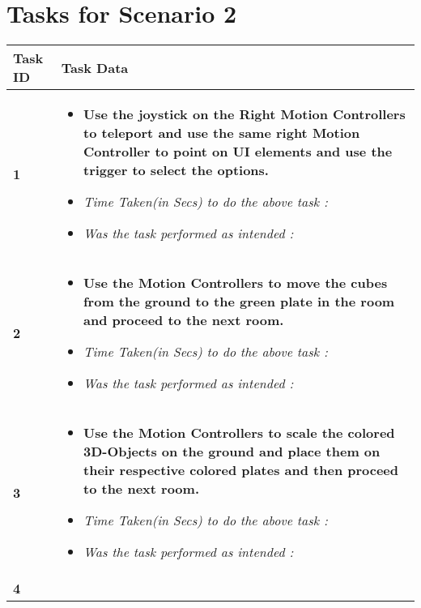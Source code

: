 \documentclass{article}
\begin{document}
\section*{Tasks for \textbf{Scenario 2}}
\begin{table}[htb]
	\centering
	\setlength{\leftmargini}{0.5cm}
	\begin{tabular}{| m{0.75cm} | m{10cm} |}
		\hline
		\textbf{Task ID} & \textbf{Task Data}                                                                                                                                       \\
		\hline \hfill \break
		\textbf{1}       &
		\begin{itemize}[label={}]
			\item \textbf{Use the joystick on the Right Motion Controllers to teleport and use the same right Motion Controller to point on UI elements and use the trigger to select the options.}
			\item \textit{Time Taken(in Secs) to do the above task :}
			\item \textit{Was the task performed as intended :}
		\end{itemize}                                     \\
		\hline \hfill \break
		\textbf{2}       &
		\begin{itemize}[label={}]
			\item \textbf{Use the Motion Controllers to move the cubes from the ground to the green plate in the room and proceed to the next room.}
			\item \textit{Time Taken(in Secs) to do the above task :}
			\item \textit{Was the task performed as intended :}
		\end{itemize}                                     \\
		\hline
		\textbf{3}       &
		\begin{itemize}[label={}]
			\item \textbf{Use the Motion Controllers to scale the colored 3D-Objects on the ground and place them on their respective colored plates and then proceed to the next room.}
			\item \textit{Time Taken(in Secs) to do the above task :}
			\item \textit{Was the task performed as intended :}
		\end{itemize} \\
		\hline \hfill \break
		\textbf{4}       &
		\begin{itemize}[label={}]

\end{itemize}
\end{tabular}
\end{table}
\end{document}

